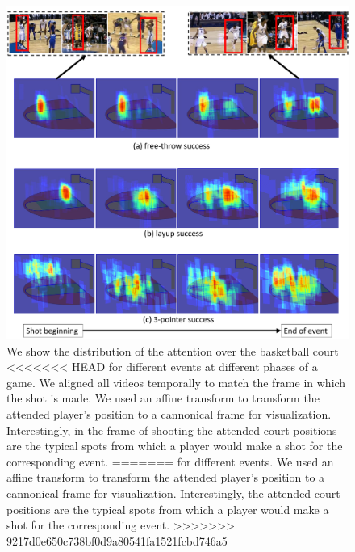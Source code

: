 \begin{figure}[t!]
\begin{center}
  \includegraphics[width=5in]{images/heatmap_figure_cropped.pdf}
\end{center}
   \caption{We show the distribution of the attention over the basketball court
<<<<<<< HEAD
     for different events at different phases of a game.  We aligned all videos
     temporally to match the frame in which the shot is made.  We used an
     affine transform to transform the attended player's position to a
     cannonical frame for visualization.  Interestingly, in the frame of
     shooting the attended court positions are the typical spots from which a
     player would make a shot for the corresponding event.
=======
     for different events. We used an affine transform to transform the
     attended player's position to a cannonical frame for visualization.
     Interestingly, the attended court positions are the typical spots from
     which a player would make a shot for the corresponding event.
>>>>>>> 9217d0e650c738bf0d9a80541fa1521fcbd746a5
   }
\label{fig:att_heatmap}
\end{figure}


